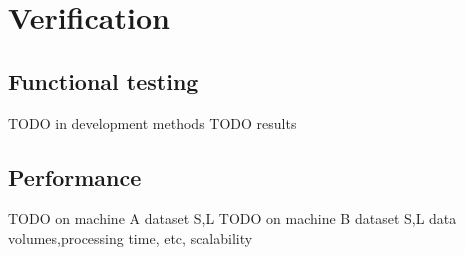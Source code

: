 \chapter{Verification}
\section{Functional testing}
TODO in development methods
TODO results

\section{Performance}
TODO on machine A dataset S,L
TODO on machine B dataset S,L
	data volumes,processing time, etc, scalability
